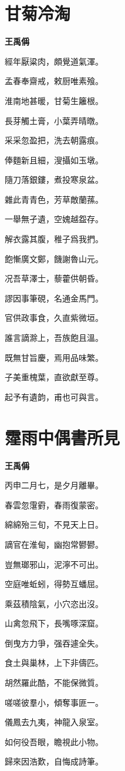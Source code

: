 \documentclass[12pt,a4paper]{ctexbook}
\begin{document}
\section{甘菊冷淘}
\textbf{王禹偁}\par\vspace{0.5em}
經年厭粱肉，頗覺道氣渾。\par
孟春奉齋戒，敕厨唯素飱。\par
淮南地甚暖，甘菊生籬根。\par
長芽觸土膏，小葉弄晴暾。\par
采采忽盈把，洗去朝露痕。\par
俸麵新且細，溲攝如玉墩。\par
隨刀落銀鏤，煮投寒泉盆。\par
雜此青青色，芳草敵蘭蓀。\par
一舉無孑遺，空媿越盌存。\par
解衣露其腹，稚子爲我捫。\par
飽慚廣文鄭，饑謝魯山元。\par
况吾草澤士，藜藿供朝昏。\par
謬因事筆硯，名通金馬門。\par
官供政事食，久直紫微垣。\par
誰言謫滁上，吾族飽且溫。\par
既無甘旨慶，焉用品味繁。\par
子美重槐葉，直欲獻至尊。\par
起予有遺韵，甫也可與言。\par

\section{霪雨中偶書所見}
\textbf{王禹偁}\par\vspace{0.5em}
丙申二月七，是夕月離畢。\par
春雲忽霮䨴，春雨復蒙密。\par
綿綿殆三旬，不見天上日。\par
謫官在淮甸，幽抱常鬰鬰。\par
豈無瑯邪山，泥濘不可出。\par
空庭唯蚯蚓，得勢互蟠屈。\par
乘茲積陰氣，小穴恣出沒。\par
山禽忽飛下，長嘴啄深窟。\par
倒曳方力爭，强吞遽全失。\par
食土與巢林，上下非儔匹。\par
胡然羅此酷，不能保微質。\par
嗟嗟彼羣小，傾奪事匪一。\par
儀鳳去九夷，神龍入泉室。\par
如何役吾眼，瞻視此小物。\par
歸來因浩歎，自悔成詩筆。\par
\end{document}

